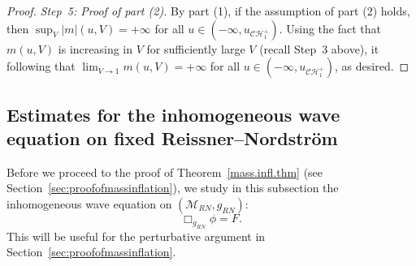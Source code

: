 \documentclass[10pt, reqno]{amsart}
\theoremstyle{definition}
\theoremstyle{remark}
\numberwithin{equation}{section}
\newcommand{\0}{\emptyset}
\newcommand{\calC}{\mathcal C}
\newcommand{\calH}{\mathcal H}
\newcommand{\CH}{\calC \calH^{+}}		%
\newcommand{\pfstep}[1]{\vspace{.5em} {\it #1.}}
\begin{document}
\begin{proof}
\pfstep{Step~5: Proof of part (2)} By part (1), if the assumption of part (2) holds, then $\sup_V |m|(u,V) = +\infty$ for all $u \in (-\infty, u_{\CH_1})$. Using the fact that $m(u,V)$ is increasing in $V$ for sufficiently large $V$ (recall Step~3 above), it following that $\lim_{V\to 1} m(u,V) = +\infty$  for all $u \in (-\infty, u_{\CH_1})$, as desired. \qedhere
\end{proof}




\subsection{Estimates for the inhomogeneous wave equation on fixed Reissner--Nordstr\"om}\label{sec:EE.inhom}

Before we proceed to the proof of Theorem~\ref{mass.infl.thm} (see Section~\ref{sec:proofofmassinflation}), we study in this subsection the inhomogeneous wave equation on $(\mathcal M_{RN}, g_{RN})$:
$$\Box_{g_{RN}}\phi=F.$$
This will be useful for the perturbative argument in Section~\ref{sec:proofofmassinflation}.
\end{document}
